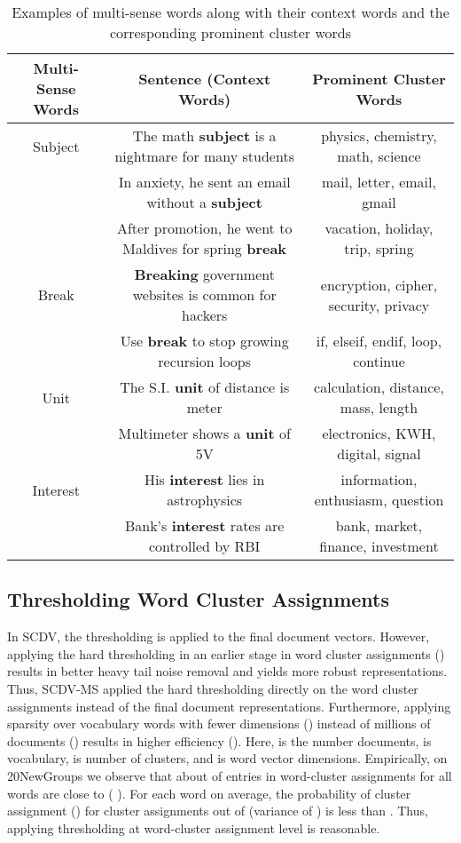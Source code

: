 \documentclass{ecai}
\newcommand{\method}{SCDV-MS}
\begin{document}
\begin{table*}[h]
\captionsetup{font=small, skip=0pt}
\begin{center}
\caption{Examples of multi-sense words along with their context words and the corresponding prominent cluster words}
\vspace{0.5 em}
\small
\label{table:sensediasm}
\begin{tabular}{c|c|c} 
 \hline
  {\bf Multi-Sense Words } & {\bf Sentence (Context Words) } & {\bf  Prominent Cluster Words} \\
  \hline
  Subject & The math \textbf{subject} is a nightmare for many students & physics, chemistry, math, science \\
   & In anxiety, he sent an email without a \textbf{subject}  & mail, letter, email, gmail \\
  \hline
  & After promotion, he went to Maldives for spring \textbf{break}  & vacation, holiday, trip,  spring \\
  Break & \textbf{Breaking} government websites is common for hackers & encryption, cipher, security, privacy\\
   & Use \textbf{break} to stop growing recursion loops & if, elseif, endif, loop, continue \\
  \hline
  Unit & The S.I. \textbf{unit} of distance is meter & calculation, distance, mass, length \\
  & Multimeter shows a \textbf{unit} of 5V & electronics, KWH, digital, signal \\
  \hline
  Interest & His \textbf{interest} lies in astrophysics & information, enthusiasm, question\\
   & Bank’s \textbf{interest} rates are controlled by RBI & bank, market, finance,  investment \\
  \hline
\end{tabular}
\end{center}
\vspace{-1.8em}
\end{table*}

\subsection{Thresholding Word Cluster Assignments}
\label{subsec:hardthres}

In SCDV, the thresholding is applied to the final document vectors. However, applying the hard thresholding in an earlier stage in word cluster assignments () results in better heavy tail noise removal and yields more robust representations. Thus, \method{} applied the hard thresholding directly on the word cluster assignments instead of the final document representations. Furthermore, applying sparsity over vocabulary words with fewer dimensions () instead of millions of documents () results in higher efficiency (). Here,  is the number documents,  is vocabulary,  is number of clusters, and  is word vector dimensions. Empirically, on 20NewGroups we observe that about  of entries in word-cluster assignments   for all words are close to  ( ). For each word on average, the probability of cluster assignment () for  cluster assignments out of  (variance of ) is less than . Thus, applying thresholding at word-cluster assignment level is reasonable. 
\end{document}
